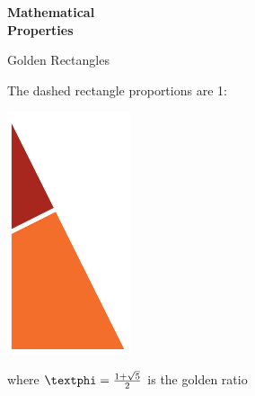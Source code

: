 \documentclass[14pt]{beamer}
\begin{document}

    \begin{frame}{}
        \begin{center}
            \textbf{\Huge Mathematical\\\bigskip Properties}\\
        \end{center}
    \end{frame}


    \begin{frame}{Golden Rectangles}
        \begin{center}
            The dashed rectangle proportions are 1:\textphi
        \end{center}
        \hspace{4.1em} \includegraphics[scale=1.0]{figures/figure020a.pdf} \\
        \begin{center}
            where $\text{\textphi} =\tfrac{1+\sqrt{5}}{2}$ is the golden ratio
        \end{center}
    \end{frame}

\end{document}
